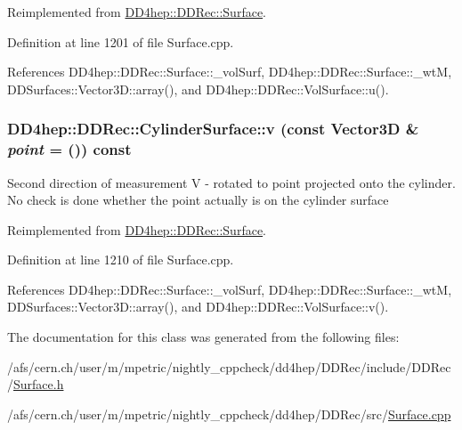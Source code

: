Reimplemented from \hyperlink{class_d_d4hep_1_1_d_d_rec_1_1_surface_af08e3ae0be217b8bc54d9a447a66be03}{DD4hep::DDRec::Surface}.

Definition at line 1201 of file Surface.cpp.

References DD4hep::DDRec::Surface::\_\-volSurf, DD4hep::DDRec::Surface::\_\-wtM, DDSurfaces::Vector3D::array(), and DD4hep::DDRec::VolSurface::u().\hypertarget{class_d_d4hep_1_1_d_d_rec_1_1_cylinder_surface_a8cf924dc19c5eb87e435dd1918e14407}{
\subsubsection[{v}]{ DD4hep::DDRec::CylinderSurface::v (const {\bf Vector3D} \& {\em point} = {()}) const}}
\label{class_d_d4hep_1_1_d_d_rec_1_1_cylinder_surface_a8cf924dc19c5eb87e435dd1918e14407}
Second direction of measurement V -\/ rotated to point projected onto the cylinder. No check is done whether the point actually is on the cylinder surface 

Reimplemented from \hyperlink{class_d_d4hep_1_1_d_d_rec_1_1_surface_a76edfb105ebae153080713c99a310044}{DD4hep::DDRec::Surface}.

Definition at line 1210 of file Surface.cpp.

References DD4hep::DDRec::Surface::\_\-volSurf, DD4hep::DDRec::Surface::\_\-wtM, DDSurfaces::Vector3D::array(), and DD4hep::DDRec::VolSurface::v().

The documentation for this class was generated from the following files:\begin{DoxyCompactItemize}
\item 
/afs/cern.ch/user/m/mpetric/nightly\_\-cppcheck/dd4hep/DDRec/include/DDRec/\hyperlink{_surface_8h}{Surface.h}\item 
/afs/cern.ch/user/m/mpetric/nightly\_\-cppcheck/dd4hep/DDRec/src/\hyperlink{_surface_8cpp}{Surface.cpp}\end{DoxyCompactItemize}

